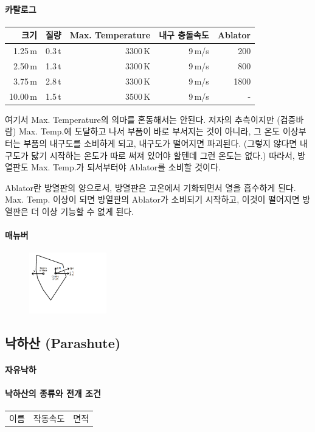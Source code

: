 \documentclass[9pt]{amsbook}
\begin{document}
\paragraph{카탈로그}
\begin{tabular}{|r|r|r|r|r|}
\hline
크기&질량& Max. Temperature& 내구 충돌속도& Ablator
\\\hline
1.25\,m&0.3\,t& 3300\,K&9\,m/s&200
\\2.50\,m&1.3\,t&3300\,K&9\,m/s&800
\\3.75\,m&2.8\,t&3300\,K&9\,m/s&1800
\\10.00\,m&1.5\,t&3500\,K&9\,m/s&-
\end{tabular}

여기서 Max. Temperature의 의마를 혼동해서는 안된다. 저자의 추측이지만 (검증바람) Max. Temp.에 도달하고 나서 부품이 바로 부서지는 것이 아니라, 그 온도 이상부터는 부품의 내구도를 소비하게 되고, 내구도가 떨어지면 파괴된다. (그렇지 않다면 내구도가 닳기 시작하는 온도가 따로 써져 있어야 할텐데 그런 온도는 없다.) 따라서, 방열판도 Max. Temp.가 되서부터야 Ablator를 소비할 것이다.

Ablator란 방열판의 양으로서, 방열판은 고온에서 기화되면서 열을 흡수하게 된다. Max. Temp. 이상이 되면 방열판의 Ablator가 소비되기 시작하고, 이것이 떨어지면 방열판은 더 이상 기능할 수 없게 된다.
\paragraph{매뉴버}

\begin{figure}
\caption{}
\includegraphics[width=0.3\textwidth]{lift.png}
\end{figure}

\subsection{낙하산 (Parashute)}
\paragraph{자유낙하}

\paragraph{낙하산의 종류와 전개 조건}
\begin{tabular}{|c|c|c|}
이름&작동속도&면적
\end{tabular}
\end{document}
